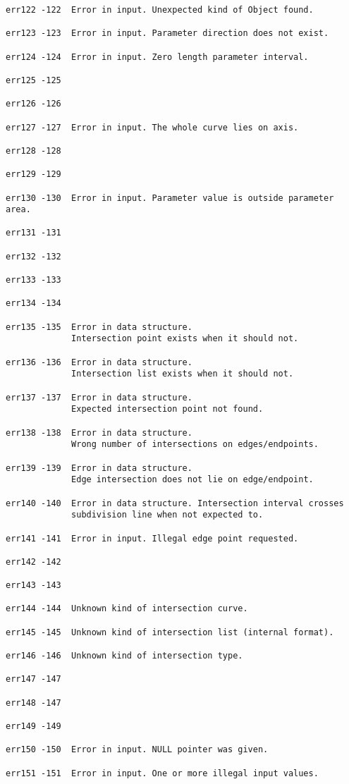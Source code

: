 \begin{verbatim}
err122 -122  Error in input. Unexpected kind of Object found.

err123 -123  Error in input. Parameter direction does not exist.

err124 -124  Error in input. Zero length parameter interval.

err125 -125

err126 -126

err127 -127  Error in input. The whole curve lies on axis.

err128 -128

err129 -129

err130 -130  Error in input. Parameter value is outside parameter area.

err131 -131

err132 -132

err133 -133

err134 -134

err135 -135  Error in data structure.
             Intersection point exists when it should not.

err136 -136  Error in data structure.
             Intersection list exists when it should not.

err137 -137  Error in data structure.
             Expected intersection point not found.

err138 -138  Error in data structure.
             Wrong number of intersections on edges/endpoints.

err139 -139  Error in data structure.
             Edge intersection does not lie on edge/endpoint.

err140 -140  Error in data structure. Intersection interval crosses
             subdivision line when not expected to.
   						
err141 -141  Error in input. Illegal edge point requested.

err142 -142  

err143 -143

err144 -144  Unknown kind of intersection curve.

err145 -145  Unknown kind of intersection list (internal format).

err146 -146  Unknown kind of intersection type.

err147 -147

err148 -147

err149 -149

err150 -150  Error in input. NULL pointer was given.

err151 -151  Error in input. One or more illegal input values.


\end{verbatim}
